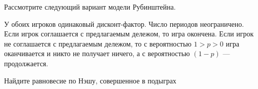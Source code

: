 \begin{problem}
 Рассмотрите следующий вариант модели Рубинштейна. \par %
У обоих игроков одинаковый дисконт-фактор. Число периодов
неограничено. Если игрок соглашается с предлагаемым дележом, то
игра окончена. Если игрок не соглашается с предлагаемым дележом,
то с вероятностью $1>p>0$ игра оканчивается и никто не получает
ничего, а с вероятностью $(1-p)$ --- продолжается. \par
Найдите равновесие по Нэшу, совершенное в подыграх



\begin{sol}

\end{sol}
\end{problem}



